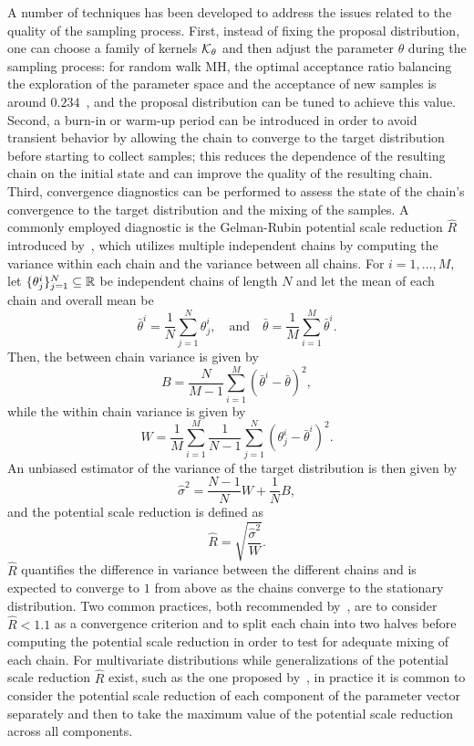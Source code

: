 A number of techniques has been developed to address the issues related to the quality of the sampling process.
First, instead of fixing the proposal distribution, one can choose a family of kernels $\mathcal K_\theta$ and then adjust the parameter $\theta$ during the sampling process: for random walk MH, the optimal acceptance ratio balancing the exploration of the parameter space and the acceptance of new samples is around $0.234$~\cite{GelmanGilksRoberts1997}, and the proposal distribution can be tuned to achieve this value.
Second, a burn-in or warm-up period can be introduced in order to avoid transient behavior by allowing the chain to converge to the target distribution before starting to collect samples; this reduces the dependence of the resulting chain on the initial state and can improve the quality of the resulting chain.
Third, convergence diagnostics can be performed to assess the state of the chain's convergence to the target distribution and the mixing of the samples.
A commonly employed diagnostic is the Gelman-Rubin potential scale reduction $\hat R$ introduced by~\cite{GelmanRubin1992}, which utilizes multiple independent chains by computing the variance within each chain and the variance between all chains.
For $i =1, \dots, M$, let $\{ \theta_{j}^i \}_{j=1}^{N} \subseteq \mathbb{R} $ be independent chains of length $N$ and let the mean of each chain and overall mean be 
\[
    \bar \theta^i = \frac{1}{N} \sum_{j=1}^{N} \theta_{j}^i, \quad \text{and} \quad \bar \theta = \frac{1}{M} \sum_{i=1}^{M} \bar \theta^i.
\]
Then, the between chain variance is given by
\[
    B = \frac{N}{M-1} \sum_{i=1}^{M} (\bar \theta^i - \bar \theta)^2,
\]
while the within chain variance is given by
\[
    W = \frac{1}{M} \sum_{i=1}^{M} \frac{1}{N-1} \sum_{j=1}^{N} (\theta_{j}^i - \bar \theta^i)^2.
\]
An unbiased estimator of the variance of the target distribution is then given by
\[
    \hat \sigma^2 = \frac{N-1}{N} W + \frac{1}{N}B,
\]
and the potential scale reduction is defined as 
\begin{equation}\label{eq:hatR}
    \hat R = \sqrt{ \frac{\hat \sigma^2}{W} }.
\end{equation}
$\hat R$ quantifies the difference in variance between the different chains and is expected to converge to $1$ from above as the chains converge to the stationary distribution. 
Two common practices, both recommended by~\cite[Chapter 11.4]{GelmanCarlinSternDunsonVehtariRubin2013}, are to consider $\hat R < 1.1$ as a convergence criterion and to split each chain into two halves before computing the potential scale reduction in order to test for adequate mixing of each chain.
For multivariate distributions while generalizations of the potential scale reduction $\hat R$ exist, such as the one proposed by~\cite{BrooksGelman1998}, in practice it is common to consider the potential scale reduction of each component of the parameter vector separately and then to take the maximum value of the potential scale reduction across all components.

